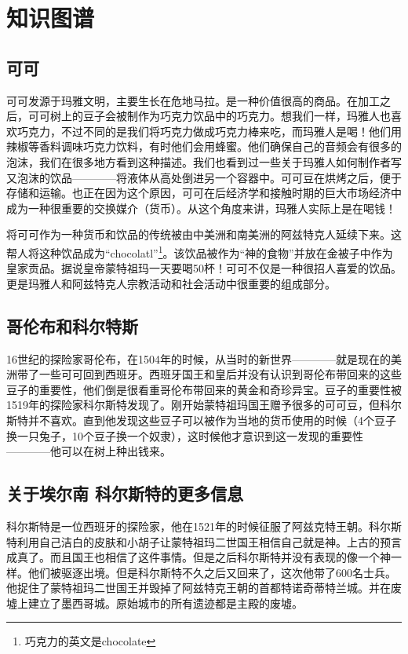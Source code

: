 \chapter{知识图谱}
   


\section{可可}
     可可发源于玛雅文明，主要生长在危地马拉。是一种价值很高的商品。在加工之后，可可树上的豆子会被制作为巧克力饮品中的巧克力。想我们一样，玛雅人也喜欢巧克力，不过不同的是我们将巧克力做成巧克力棒来吃，而玛雅人是喝！他们用辣椒等香料调味巧克力饮料，有时他们会用蜂蜜。他们确保自己的音频会有很多的泡沫，我们在很多地方看到这种描述。我们也看到过一些关于玛雅人如何制作者写又泡沫的饮品————将液体从高处倒进另一个容器中。可可豆在烘烤之后，便于存储和运输。也正在因为这个原因，可可在后经济学和接触时期的巨大市场经济中成为一种很重要的交换媒介（货币）。从这个角度来讲，玛雅人实际上是在喝钱！\par
     将可可作为一种货币和饮品的传统被由中美洲和南美洲的阿兹特克人延续下来。这帮人将这种饮品成为“chocolatl”\footnote{巧克力的英文是chocolate}。该饮品被作为“神的食物”并放在金被子中作为皇家贡品。据说皇帝蒙特祖玛一天要喝50杯！可可不仅是一种很招人喜爱的饮品。更是玛雅人和阿兹特克人宗教活动和社会活动中很重要的组成部分。\par

\section{哥伦布和科尔特斯}
     16世纪的探险家哥伦布，在1504年的时候，从当时的新世界————就是现在的美洲带了一些可可回到西班牙。西班牙国王和皇后并没有认识到哥伦布带回来的这些豆子的重要性，他们倒是很看重哥伦布带回来的黄金和奇珍异宝。豆子的重要性被1519年的探险家科尔斯特发现了。刚开始蒙特祖玛国王赠予很多的可可豆，但科尔斯特并不喜欢。直到他发现这些豆子可以被作为当地的货币使用的时候（4个豆子换一只兔子，10个豆子换一个奴隶），这时候他才意识到这一发现的重要性————他可以在树上种出钱来。

\section{关于埃尔南 科尔斯特的更多信息}
     科尔斯特是一位西班牙的探险家，他在1521年的时候征服了阿兹克特王朝。科尔斯特利用自己洁白的皮肤和小胡子让蒙特祖玛二世国王相信自己就是神。上古的预言成真了。而且国王也相信了这件事情。但是之后科尔斯特并没有表现的像一个神一样。他们被驱逐出境。但是科尔斯特不久之后又回来了，这次他带了600名士兵。他捉住了蒙特祖玛二世国王并毁掉了阿兹特克王朝的首都特诺奇蒂特兰城。并在废墟上建立了墨西哥城。原始城市的所有遗迹都是主殿的废墟。


